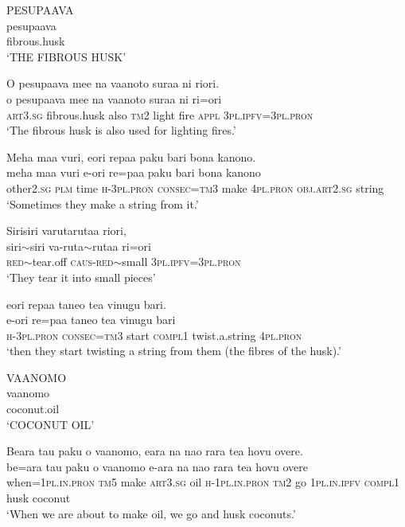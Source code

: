 \ea\label{ex:text01-118}
PESUPAAVA\\
\gll pesupaava\\
     fibrous.husk\\
\glt `THE FIBROUS HUSK'
\z

\ea\label{ex:text01-119}
O pesupaava mee na vaanoto suraa ni riori.\\
\gll o	pesupaava	mee	na	vaanoto	suraa	ni	ri=ori\\
     \textsc{art}3.\textsc{sg}	fibrous.husk	also	\textsc{tm}2	light	fire	\textsc{appl}	3\textsc{pl}.\textsc{ipfv}=3\textsc{pl}.\textsc{pron}\\
\glt `The fibrous husk is also used for lighting fires.'
\z

\ea\label{ex:text01-120}
Meha maa vuri, eori repaa paku bari bona kanono.\\
\gll meha	maa	vuri	e-ori	re=paa	paku	bari	bona	kanono\\
     other2.\textsc{sg}	\textsc{plm}	time	\textsc{h}-3\textsc{pl}.\textsc{pron}	\textsc{consec}=\textsc{tm}3	make	4\textsc{pl}.\textsc{pron}	\textsc{obj}.\textsc{art}2.\textsc{sg}	string\\
\glt `Sometimes they make a string from it.'
\z

\ea\label{ex:text01-121}
Sirisiri varutarutaa riori,\\
\gll siri{$\sim$}siri	va-ruta{$\sim$}rutaa	ri=ori\\
     \textsc{red}{$\sim$}tear.off	\textsc{caus}-\textsc{red}{$\sim$}small	3\textsc{pl}.\textsc{ipfv}=3\textsc{pl}.\textsc{pron}\\
\glt `They tear it into small pieces'
\z

\ea\label{ex:text01-122}
eori repaa taneo tea vinugu bari.\\
\gll e-ori	re=paa	taneo	tea	vinugu	bari\\
     \textsc{h}-3\textsc{pl}.\textsc{pron}	\textsc{consec}=\textsc{tm}3	start	\textsc{compl}1	twist.a.string	4\textsc{pl}.\textsc{pron}\\
\glt `then they start twisting a string from them (the fibres of the husk).'
\z

\ea\label{ex:text01-123}
VAANOMO\\
\gll vaanomo\\
     coconut.oil\\
\glt `COCONUT OIL'
\z

\ea\label{ex:text01-124}
Beara tau paku o vaanomo, eara na nao rara tea hovu overe.\\
\gll be=ara	tau	paku	o	vaanomo	e-ara	na	nao	rara	tea	hovu	overe\\
     when=1\textsc{pl}.\textsc{in}.\textsc{pron}	\textsc{tm}5	make	\textsc{art}3.\textsc{sg}	oil	\textsc{h}-1\textsc{pl}.\textsc{in}.\textsc{pron}	\textsc{tm}2	go	1\textsc{pl}.\textsc{in}.\textsc{ipfv}	\textsc{compl}1	husk	coconut\\
\glt `When we are about to make oil, we go and husk coconuts.'
\z

